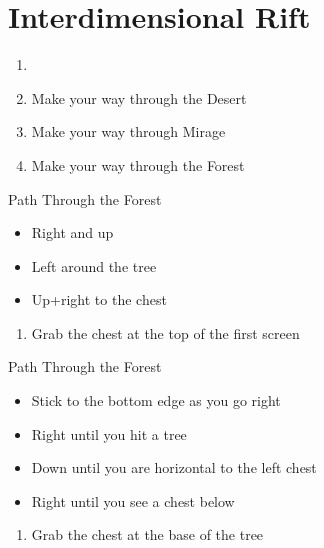 \chapter{Interdimensional Rift}

\vspace{\baselineskip}

\begin{paracol}{2}

\begin{enumerate}
    \item {}
    \item Make your way through the Desert
    \item Make your way through Mirage
    \item Make your way through the Forest
\end{enumerate}

\begin{misc}{Path Through the Forest}
    \begin{itemize}
        \item Right and up
        \item Left around the tree
        \item Up+right to the chest
    \end{itemize}
\end{misc}

\begin{enumerate}[resume]
    \item Grab the  chest at the top of the first screen
\end{enumerate}

\begin{misc}{Path Through the Forest}
    \begin{itemize}
        \item Stick to the bottom edge as you go right
        \item Right until you hit a tree
        \item Down until you are horizontal to the left chest
        \item Right until you see a chest below
    \end{itemize}
\end{misc}

\begin{enumerate}[resume]
    \item Grab the  chest at the base of the tree
\end{enumerate}


\end{paracol}
